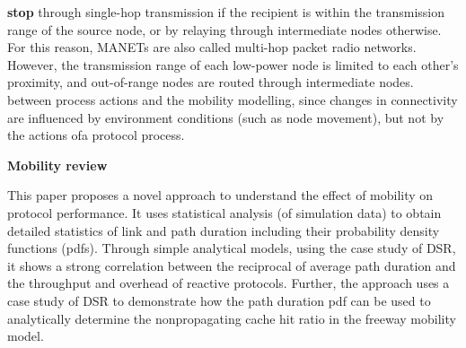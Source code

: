 \documentclass[letterpaper, 10 pt, conference]{ieeeconf}  %
\begin{document}
\textbf{stop}
through single-hop transmission if the recipient is
within the transmission range of the source node,
or by relaying through intermediate nodes otherwise.
For this reason, MANETs are also called
multi-hop packet radio networks. However, the
transmission range of each low-power node is limited
to each other’s proximity, and out-of-range
nodes are routed through intermediate nodes. between process actions and the mobility modelling, since changes in connectivity are influenced by environment conditions (such as node movement), but not by the actions ofa protocol process.


\textbf{Mobility review}




This paper proposes a novel approach to understand the
effect of mobility on protocol performance. It uses statistical
analysis (of simulation data) to obtain detailed statistics of link
and path duration including their probability density functions
(pdfs). Through simple analytical models, using the case study
of DSR, it shows a strong correlation between the reciprocal
of average path duration and the throughput and overhead of
reactive protocols. Further, the approach uses a case study of
DSR to demonstrate how the path duration pdf can be used to
analytically determine the nonpropagating cache hit ratio in the
freeway mobility model.
\end{document}
